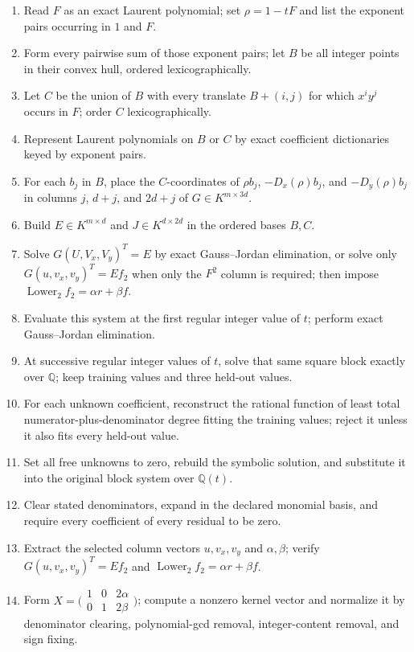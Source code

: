 \documentclass[11pt]{article}
\newcommand{\Dx}{D_x}
\newcommand{\Dy}{D_y}
\begin{document}
\begingroup
\fontsize{9.5}{10.9}\selectfont
\begin{enumerate}[label=\texttt{\arabic*.},leftmargin=2.7em,itemsep=0.22em,topsep=0pt]
\item Read $F$ as an exact Laurent polynomial; set $\rho=1-tF$ and list the exponent pairs occurring in $1$ and $F$.
\item Form every pairwise sum of those exponent pairs; let $B$ be all integer points in their convex hull, ordered lexicographically.
\item Let $C$ be the union of $B$ with every translate $B+(i,j)$ for which $x^iy^j$ occurs in $F$; order $C$ lexicographically.
\item Represent Laurent polynomials on $B$ or $C$ by exact coefficient dictionaries keyed by exponent pairs.
\item For each $b_j$ in $B$, place the $C$-coordinates of $\rho b_j$, $-\Dx(\rho)b_j$, and $-\Dy(\rho)b_j$ in columns $j$, $d+j$, and $2d+j$ of $G\in K^{m\times3d}$.
\item Build $E\in K^{m\times d}$ and $J\in K^{d\times2d}$ in the ordered bases $B,C$.
\item Solve $G(U,V_x,V_y)^T=E$ by exact Gauss--Jordan elimination, or solve only $G(u,v_x,v_y)^T=Ef_2$ when only the $F^2$ column is required; then impose $\operatorname{Lower}_2f_2=\alpha r+\beta f$.
\item Evaluate this system at the first regular integer value of $t$; perform exact Gauss--Jordan elimination.
\item At successive regular integer values of $t$, solve that same square block exactly over $\mathbb Q$; keep training values and three held-out values.
\item For each unknown coefficient, reconstruct the rational function of least total numerator-plus-denominator degree fitting the training values; reject it unless it also fits every held-out value.
\item Set all free unknowns to zero, rebuild the symbolic solution, and substitute it into the original block system over $\mathbb Q(t)$.
\item Clear stated denominators, expand in the declared monomial basis, and require every coefficient of every residual to be zero.
\item Extract the selected column vectors $u,v_x,v_y$ and $\alpha,\beta$; verify $G(u,v_x,v_y)^T=Ef_2$ and $\operatorname{Lower}_2f_2=\alpha r+\beta f$.
\item Form $X=\bigl(\begin{smallmatrix}1&0&2\alpha\\0&1&2\beta\end{smallmatrix}\bigr)$; compute a nonzero kernel vector and normalize it by denominator clearing, polynomial-gcd removal, integer-content removal, and sign fixing.

\end{enumerate}
\end{document}
